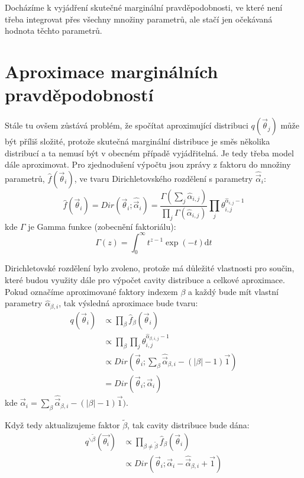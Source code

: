 Docházíme k vyjádření skutečné marginální pravděpodobnosti, ve které není třeba
integrovat přes všechny množiny parametrů, ale stačí jen očekávaná hodnota
těchto parametrů.

\section{Aproximace marginálních pravděpodobností}

Stále tu ovšem zůstává problém, že spočítat aproximující distribuci
$q(\vec{\theta}_j)$ může být příliš složité, protože skutečná marginální
distribuce je směs několika distribucí a ta nemusí být v obecném případě
vyjádřitelná. Je tedy třeba model dále aproximovat. Pro zjednodušení výpočtu
jsou zprávy z faktoru do množiny parametrů, $\hat{f}(\vec{\theta}_i)$, ve tvaru
Dirichletovského rozdělení s parametry $\hat{\vec{\alpha}}_i$:
\begin{equation}
    \hat{f}(\vec{\theta}_i) = Dir(\vec{\theta}_i; \hat{\vec{\alpha}}_i) =
    \frac{\Gamma (\sum_j \hat{\alpha}_{i,j})}{\prod_j
    \Gamma(\hat{\alpha}_{i,j})} \prod_j \theta_{i,j}^{\hat\alpha_{i,j} - 1}
\end{equation}
kde $\Gamma$ je Gamma funkce (zobecnění faktoriálu):
\begin{equation}
    \Gamma(z) = \int_0^\infty \! t^{z-1} \exp(-t) \mathrm{d}t
\end{equation}

Dirichletovské rozdělení bylo zvoleno, protože má důležité vlastnosti pro
součin, které budou využity dále pro výpočet cavity distribuce a celkové
aproximace. Pokud označíme aproximované faktory indexem $\beta$ a každý bude
mít vlastní parametry $\hat\alpha_{\beta, i}$, tak výsledná aproximace bude
tvaru:
\begin{align}
q(\vec{\theta}_i) &\propto \prod_\beta \hat{f}_{\beta}(\vec{\theta}_i) \\
&\propto \prod_\beta \prod_j \theta_{i,j}^{\hat\alpha_{\beta,i,j} - 1} \\
&\propto Dir(\vec{\theta}_i; \sum_\beta \hat{\vec{\alpha}}_{\beta,i} -
    (|\beta| - 1) \vec{1}) \\
&= Dir(\vec{\theta}_i; \vec{\alpha}_i) \label{eq:ep:aprx_1}
\end{align}
kde $\vec{\alpha}_i = \sum_\beta \hat{\vec{\alpha}}_{\beta,i} - (|\beta| - 1)
\vec{1})$.

Když tedy aktualizujeme faktor $\tilde\beta$, tak cavity distribuce bude dána:
\begin{align}
q^{\backslash \tilde\beta}(\vec{\theta_i}) &\propto \prod_{\beta \ne
    \tilde\beta} \hat{f}_{\beta}(\vec{\theta}_i) \\
& \propto Dir(\vec{\theta}_i; \vec{\alpha}_i - \hat{\vec{\alpha}}_{\beta, i} +
    \vec{1})
\end{align}

